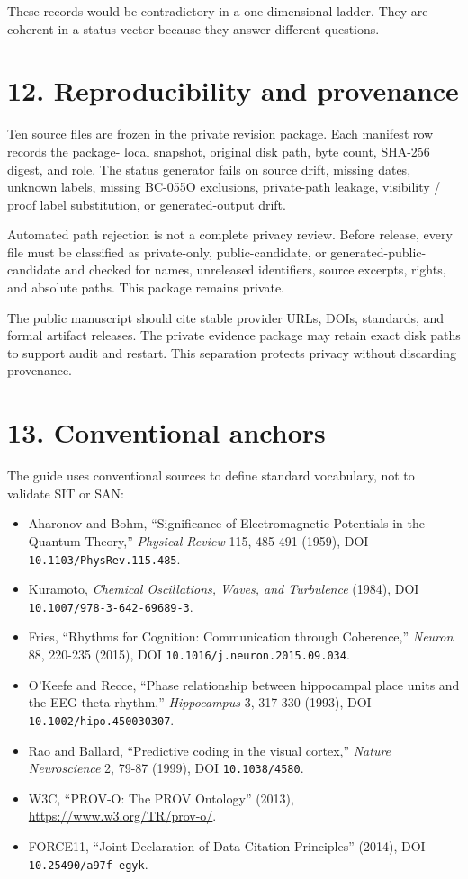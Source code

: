 \documentclass[
  american,
  11pt,
  letterpaper,
]{article}
\providecommand{\tightlist}{%
  \setlength{\itemsep}{0pt}\setlength{\parskip}{0pt}}
\begin{document}
These records would be contradictory in a one-dimensional ladder. They are coherent in a status vector because they answer different questions.

\section{12. Reproducibility and provenance}\label{reproducibility-and-provenance}

Ten source files are frozen in the private revision package. Each manifest row records the package- local snapshot, original disk path, byte count, SHA-256 digest, and role. The status generator fails on source drift, missing dates, unknown labels, missing BC-055O exclusions, private-path leakage, visibility / proof label substitution, or generated-output drift.

Automated path rejection is not a complete privacy review. Before release, every file must be classified as private-only, public-candidate, or generated-public-candidate and checked for names, unreleased identifiers, source excerpts, rights, and absolute paths. This package remains private.

The public manuscript should cite stable provider URLs, DOIs, standards, and formal artifact releases. The private evidence package may retain exact disk paths to support audit and restart. This separation protects privacy without discarding provenance.

\section{13. Conventional anchors}\label{conventional-anchors}

The guide uses conventional sources to define standard vocabulary, not to validate SIT or SAN:

\begin{itemize}
\tightlist
\item
  Aharonov and Bohm, ``Significance of Electromagnetic Potentials in the Quantum Theory,'' \emph{Physical Review} 115, 485-491 (1959), DOI \nolinkurl{10.1103/PhysRev.115.485}.
\item
  Kuramoto, \emph{Chemical Oscillations, Waves, and Turbulence} (1984), DOI \nolinkurl{10.1007/978-3-642-69689-3}.
\item
  Fries, ``Rhythms for Cognition: Communication through Coherence,'' \emph{Neuron} 88, 220-235 (2015), DOI \nolinkurl{10.1016/j.neuron.2015.09.034}.
\item
  O'Keefe and Recce, ``Phase relationship between hippocampal place units and the EEG theta rhythm,'' \emph{Hippocampus} 3, 317-330 (1993), DOI \nolinkurl{10.1002/hipo.450030307}.
\item
  Rao and Ballard, ``Predictive coding in the visual cortex,'' \emph{Nature Neuroscience} 2, 79-87 (1999), DOI \texttt{10.1038/4580}.
\item
  W3C, ``PROV-O: The PROV Ontology'' (2013), \url{https://www.w3.org/TR/prov-o/}.
\item
  FORCE11, ``Joint Declaration of Data Citation Principles'' (2014), DOI \nolinkurl{10.25490/a97f-egyk}.
\end{itemize}
\end{document}
